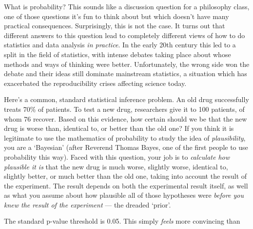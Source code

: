 \documentclass[a4paper, 12pt]{article}
\title{}
\author{Brendon J. Brewer}
\begin{document}
\sffamily
\maketitle

What is probability? This sounds like a discussion question for a
philosophy class, one of those questions it's fun to think about but which
doesn't have many practical consequences. Surprisingly, this is not the case.
It turns out that different answers to this question lead to completely
different views of how to do statistics and data analysis {\em in practice}.
In the early 20th century this led to a split in the field of statistics,
with intense debates taking place about whose methods and ways of thinking
were better. Unfortunately, the wrong side won the debate and their
ideas still dominate mainstream statistics, a situation which
has exacerbated the reproducibility crises affecting science today.

Here's a common, standard statistical inference problem. An old drug
successfully treats 70\% of patients. To test a new drug, researchers give it
to 100 patients, of whom 76 recover. Based on this evidence, how certain
should we be that the new drug is worse than, identical to, or better than the
old one? If you think it is legitimate to use the mathematics of probability
to study the idea of {\em plausibility}, you are a `Bayesian' (after Reverend
Thomas Bayes, one of the first people to use probability this way). Faced with
this question, your job is to {\em calculate how plausible it is} that the new
drug is much worse, slightly worse, identical to, slightly better, or much better
than the old one, taking into account the result of the experiment. The result
depends on both the experimental result itself, as well as what you assume
about how plausible all of those hypotheses were {\em before you knew the result
of the experiment} --- the dreaded `prior'.


The standard p-value threshold is 0.05. This simply {\em feels} more
convincing than 
\end{document}
